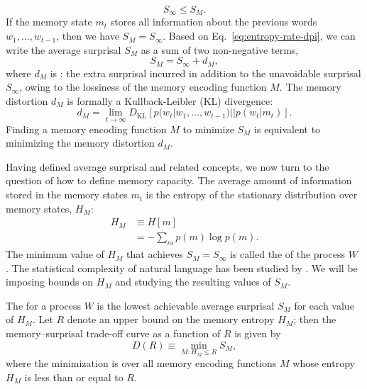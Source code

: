 \begin{equation}
    \label{eq:entropy-rate-dpi}
    S_\infty \le S_M.
\end{equation}
If the memory state $m_t$ stores all information about the previous words $w_1, \dots, w_{t-1}$, then we have $S_M = S_\infty$.
Based on Eq.~\ref{eq:entropy-rate-dpi}, we can write the average surprisal $S_M$ as a sum of two non-negative terms,
\begin{equation}
    S_M = S_\infty + d_M,
\end{equation}
where $d_M$ is : the extra surprisal incurred in addition to the unavoidable surprisal $S_\infty$, owing to the lossiness of the memory encoding function $M$. 
The memory distortion $d_M$ is formally a Kullback-Leibler (KL) divergence:
\begin{equation}
    \label{eq:memory-distortion}
    d_M = \lim_{t \rightarrow \infty} D_{\text{KL}} [ p(w_t | w_1, \dots, w_{t-1}) || p(w_t | m_t)].
\end{equation}
Finding a memory encoding function $M$ to minimize $S_M$ is equivalent to minimizing the memory distortion $d_M$.

Having defined average surprisal and related concepts, we now turn to the question of how to define memory capacity. The average amount of information stored in the memory states $m_t$ is the entropy of the stationary distribution over memory states, $H_M$:
\begin{align}
    \label{eq:memory-entropy}
    H_M &\equiv H[m] \\
    &= - \sum_m p(m) \log p(m).
\end{align}
The minimum value of $H_M$ that achieves $S_M = S_\infty$ is called the  of the process $W$ \citep{shalizi2001computational}. The statistical complexity of natural language has been studied by \citet{hahn2019neural}. We will be imposing bounds on $H_M$ and studying the resulting values of $S_M$. 

\begin{definition}
The  for a process $W$ is the lowest achievable average surprisal $S_M$ for each value of $H_M$. Let $R$ denote an upper bound on the memory entropy $H_M$; then the memory--surprisal trade-off curve as a function of $R$ is given by
\begin{equation}
    \label{eq:ms-formal}
    D(R) \equiv \min_{M : H_M \le R} S_M,
\end{equation}
where the minimization is over all memory encoding functions $M$ whose entropy $H_M$ is less than or equal to $R$.
\end{definition}

